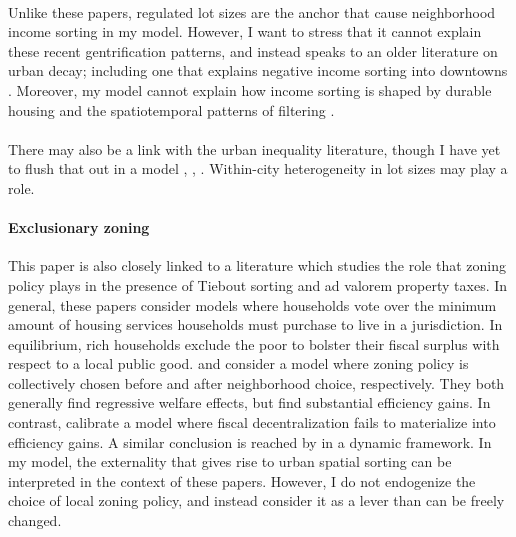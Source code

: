 \paragraph*{}
Unlike these papers, regulated lot sizes are the anchor that cause neighborhood income sorting in my model. However, I want to stress that it cannot explain these recent gentrification patterns, and instead speaks to an older literature on urban decay; including one that explains negative income sorting into downtowns \citep{parispoor} \citep{ccpoortransport}. Moreover, my model cannot explain how income sorting is shaped by durable housing and the spatiotemporal patterns of filtering \citep{Gentrificationcycles}. 

\paragraph*{}
There may also be a link with the urban inequality literature, though I have yet to flush that out in a model \citep{ineqcitysize}, \citep{spatialsorting}, \citep{FogliGuerrieri}. Within-city heterogeneity in lot sizes may play a role.

\paragraph*{Exclusionary zoning}
This paper is also closely linked to a literature which studies the role that zoning policy plays in the presence of Tiebout sorting and ad valorem property taxes. In general, these papers consider models where households vote over the minimum amount of housing services households must purchase to live in a jurisdiction. In equilibrium, rich households exclude the poor to bolster their fiscal surplus with respect to a local public good. \cite{calabresetal} and \cite{keepingpeopleout} consider a model where zoning policy is collectively chosen before and after neighborhood choice, respectively. They both generally find regressive welfare effects, but find substantial efficiency gains. In contrast, \cite{ineffTiebout} calibrate a model where fiscal decentralization fails to materialize into efficiency gains. A similar conclusion is reached by \cite{barcoate} in a dynamic framework. In my model, the externality that gives rise to urban spatial sorting can be interpreted in the context of these papers. However, I do not endogenize the choice of local zoning policy, and instead consider it as a lever than can be freely changed. 

